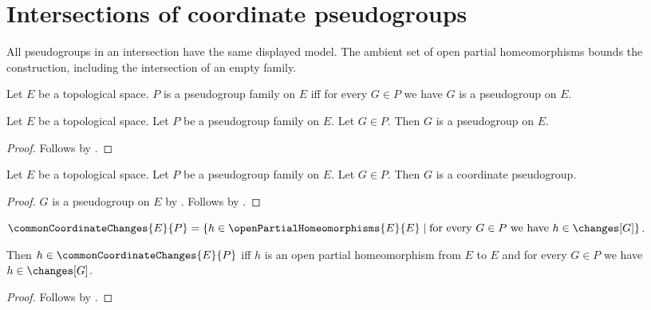 \section{Intersections of coordinate pseudogroups}



All pseudogroups in an intersection have the same displayed model.
The ambient set of open partial homeomorphisms bounds the construction,
including the intersection of an empty family.

\begin{definition}\label{pseudogroup_family}
    Let $E$ be a topological space.
    $P$ is a pseudogroup family on $E$ iff
        for every $G\in P$ we have $G$ is a pseudogroup on $E$.
\end{definition}

\begin{classification}\label{pseudogroup_family_member_on}
    Let $E$ be a topological space.
    Let $P$ be a pseudogroup family on $E$.
    Let $G\in P$.
    Then $G$ is a pseudogroup on $E$.
\end{classification}
\begin{proof}
    Follows by .
\end{proof}

\begin{classification}\label{pseudogroup_family_member}
    Let $E$ be a topological space.
    Let $P$ be a pseudogroup family on $E$.
    Let $G\in P$.
    Then $G$ is a coordinate pseudogroup.
\end{classification}
\begin{proof}
    $G$ is a pseudogroup on $E$ by .
    Follows by .
\end{proof}

\begin{definition}\label{common_coordinate_changes}
    $\commonCoordinateChanges{E}{P}=\{h\in\openPartialHomeomorphisms{E}{E}\mid
        \text{for every $G\in P$ we have $h\in\changes[G]$}\}$.
\end{definition}

\begin{theorem}\label{common_coordinate_changes_iff}
    Then $h\in\commonCoordinateChanges{E}{P}$ iff
        $h$ is an open partial homeomorphism from $E$ to $E$ and
        for every $G\in P$ we have $h\in\changes[G]$.
\end{theorem}
\begin{proof}
    Follows by .
\end{proof}

